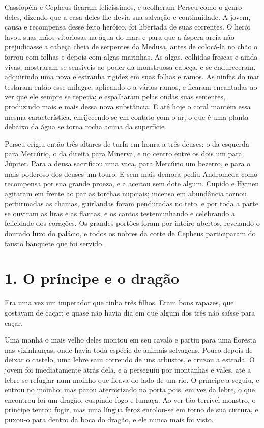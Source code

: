 Cassiopéia e Cepheus ficaram felicíssimos, e acolheram Perseu como o
genro deles, dizendo que a casa deles lhe devia sua salvação e
continuidade. A jovem, causa e recompensa desse feito heróico, foi
libertada de suas correntes. O herói lavou suas mãos vitoriosas na
água do mar, e para que a áspera areia não prejudicasse a cabeça
cheia de serpentes da Medusa, antes de colocá-la no chão o forrou com
folhas e depois com algas-marinhas. As algas, colhidas frescas e
ainda vivas, mostraram-se sensíveis ao poder da monstruosa cabeça, e
se endureceram, adquirindo uma nova e estranha rigidez em suas folhas
e ramos. As ninfas do mar testaram então esse milagre, aplicando-o a
vários ramos, e ficaram encantadas ao ver que ele sempre se repetia;
e espalharam pelas ondas suas sementes, produzindo mais e mais dessa
nova substância. E até hoje o coral mantém essa mesma característica,
enrijecendo-se em contato com o ar; o que é uma planta debaixo da
água se torna rocha acima da superfície.

Perseu erigiu então três altares de turfa em honra a três deuses: o da
esquerda para Mercúrio, o da direita para Minerva, e no centro entre
os dois um para Júpiter. Para a deusa sacrificou uma vaca, para
Mercúrio um bezerro, e para o mais poderoso dos deuses um touro. E
sem mais demora pediu Andromeda como recompensa por sua grande
proeza, e a aceitou sem dote algum. Cupido e Hymen agitaram em frente
ao par as torchas nupciais; incenso em abundância tornou perfurmadas
as chamas, guirlandas foram penduradas no teto, e por toda a parte se
ouviram as liras e as flautas, e os cantos testemunhando e celebrando
a felicidade dos corações. Os grandes portões foram por inteiro
abertos, revelando o dourado luxo do palácio, e todos os nobres da
corte de Cepheus participaram do fausto banquete que foi servido.

\chapter{1. O príncipe e o dragão}

Era uma vez um imperador que tinha três filhos. Eram bons rapazes, que
gostavam de caçar; e quase não havia dia em que algum dos três não
saísse para caçar.

Uma manhã o mais velho deles montou em seu cavalo e partiu para uma
floresta nas vizinhanças, onde havia toda espécie de animais
selvagens. Pouco depois de deixar o castelo, uma lebre saiu correndo
de uns arbustos, e cruzou a estrada. O jovem foi imediatamente atrás
dela, e a perseguiu por montanhas e vales, até a lebre se refugiar
num moinho que ficava do lado de um rio. O príncipe a seguiu, e
entrou no moinho; mas parou aterrorizado na porta pois, em vez da
lebre, o que encontrou foi um dragão, cuspindo fogo e fumaça. Ao ver
tão terrível monstro, o príncipe tentou fugir, mas uma língua feroz
enrolou-se em torno de sua cintura, e puxou-o para dentro da boca do
dragão, e ele nunca mais foi visto.


